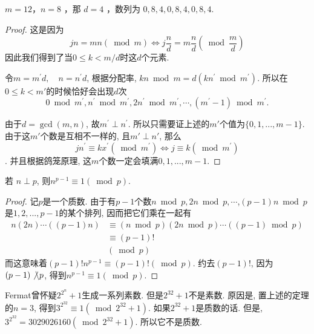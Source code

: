 \documentclass{ctexart}
\newcommand{\bzc}{\not\backslash}
\begin{document}
\begin{example}
    $m=12 ， n=8$ ，那 $d=4$ ，数列为 $0,8,4,0,8,4,0,8,4$.
    
\end{example}


\begin{proof}
     这是因为
    $$
j n=m n(\bmod m) \Leftrightarrow j \frac{n}{d}=m \frac{n}{d}\left(\bmod \frac{m}{d}\right)
$$
因此我们得到了当$0\leq k<m/d$时这$d$个元素. 

 令$m=m^{\prime} d, \quad n=n^{\prime} d$, 根据分配率, $k n \bmod m=d\left(k n^{\prime} \bmod m^{\prime}\right)$. 所以在$0\leq k<m'$的时候恰好会出现$d$次$$0 \bmod m^{\prime}, n^{\prime} \bmod m^{\prime}, 2 n^{\prime} \bmod m^{\prime}, \cdots,\left(m^{\prime}-1\right) \bmod m^{\prime}.$$

由于$d=\gcd(m,n)$, 故$m^{\prime} \perp n^{\prime}$. 所以只需要证上述的$m'$个值为$\{ 0,1, ..., m-1 \}$. 由于这$m'$个数是互相不一样的, 且$m' \perp n'$, 那么
$$j n^{\prime} \equiv k x^{\prime}\left(\bmod m^{\prime}\right) \Leftrightarrow j \equiv k\left(\bmod m^{\prime}\right)$$. 并且根据鸽笼原理, 这$m$个数一定会填满$0, 1, ..., m-1$. 


\end{proof}

\begin{prop}[Fermat小定理] 若 $n \perp p$, 则$n^{p-1} \equiv 1(\bmod p)$.
    
\end{prop}

\begin{proof}
    记$p$是一个质数. 由于有$p-1$个数$n \bmod p, 2 n \bmod p, \cdots$,$(p-1) n \bmod p$是$1,2, ..., p-1$的某个排列, 因而把它们乘在一起有
    $$
\begin{aligned}
n(2 n) \cdots((p-1) n) & \equiv(n \bmod p)(2 n \bmod p) \cdots((p-1) \bmod p) \\
& \equiv(p-1)! \\
& (\bmod p)
\end{aligned}
$$
而这意味着$(p-1)!n^{p-1} \equiv(p-1)!(\bmod p)$. 约去$(p-1)!$, 因为$(p-1)\bzc p$, 得到$n^{p-1}\equiv 1(\bmod p)$.
\end{proof}

\begin{example}Fermat曾怀疑$2^{2^n}+1$生成一系列素数. 但是$2^{32}+1$不是素数. 原因是, 置上述的定理的$n=3$, 得到$3^{2^{32}} \equiv 1\left(\bmod 2^{32}+1\right)$. 如果$2^{32}+1$是质数的话. 但是, $3^{2^{32}}=3029026160\left(\bmod 2^{32}+1\right)$. 所以它不是质数. 
    
\end{example}
\end{document}
